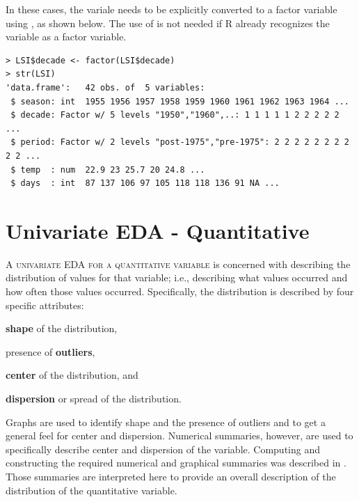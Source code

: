 \documentclass[10pt,openany]{book}\usepackage[]{graphicx}\usepackage[]{color}
\makeatletter
\newenvironment{kframe}{%
 \def\at@end@of@kframe{}%
 \ifinner\ifhmode%
  \def\at@end@of@kframe{\end{minipage}}%
  \begin{minipage}{\columnwidth}%
 \fi\fi%
 \def\FrameCommand##1{\hskip\@totalleftmargin \hskip-\fboxsep
 \colorbox{shadecolor}{##1}\hskip-\fboxsep
     \hskip-\linewidth \hskip-\@totalleftmargin \hskip\columnwidth}%
 \MakeFramed {\advance\hsize-\width
   \@totalleftmargin\z@ \linewidth\hsize
   \@setminipage}}%
 {\par\unskip\endMakeFramed%
 \at@end@of@kframe}
\newenvironment{knitrout}{}{} %
\makeatother
\begin{document}
In these cases, the variale needs to be explicitly converted to a factor variable using , as shown below. The use of  is not needed if R already recognizes the variable as a factor variable.
\begin{knitrout}
\color{fgcolor}\begin{kframe}
\begin{verbatim}
> LSI$decade <- factor(LSI$decade)
> str(LSI)
'data.frame':	42 obs. of  5 variables:
 $ season: int  1955 1956 1957 1958 1959 1960 1961 1962 1963 1964 ...
 $ decade: Factor w/ 5 levels "1950","1960",..: 1 1 1 1 1 2 2 2 2 2 ...
 $ period: Factor w/ 2 levels "post-1975","pre-1975": 2 2 2 2 2 2 2 2 2 2 ...
 $ temp  : num  22.9 23 25.7 20 24.8 ...
 $ days  : int  87 137 106 97 105 118 118 136 91 NA ...
\end{verbatim}
\end{kframe}
\end{knitrout}



\chapter[Univ EDA Quantitative]{Univariate EDA - Quantitative} \label{chap:UnivEDAQuant2}

\minitoc
\vspace{40pt}

\lettrine{A}{ univariate EDA for a quantitative variable} is concerned with describing the distribution of values for that variable; i.e., describing what values occurred and how often those values occurred. Specifically, the distribution is described by four specific attributes:

\vspace{-12pt}
\begin{Enumerate}
  \item \textbf{shape} of the distribution,
  \item presence of \textbf{outliers},
  \item \textbf{center} of the distribution, and
  \item \textbf{dispersion} or spread of the distribution.
\end{Enumerate}
\vspace{-8pt}

Graphs are used to identify shape and the presence of outliers and to get a general feel for center and dispersion. Numerical summaries, however, are used to specifically describe center and dispersion of the variable. Computing and constructing the required numerical and graphical summaries was described in . Those summaries are interpreted here to provide an overall description of the distribution of the quantitative variable.
\end{document}
